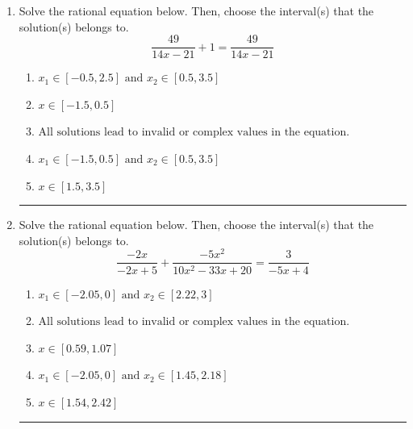 \documentclass[14pt]{extbook}
\newcommand{\litem}[1]{\item#1\hspace*{-1cm}\rule{\textwidth}{0.4pt}}
\begin{document}
\begin{enumerate}
\litem{
Solve the rational equation below. Then, choose the interval(s) that the solution(s) belongs to.\[ \frac{49}{14x -21} + 1 = \frac{49}{14x -21} \]\begin{enumerate}[label=\Alph*.]
\item \( x_1 \in [-0.5, 2.5] \text{ and } x_2 \in [0.5,3.5] \)
\item \( x \in [-1.5,0.5] \)
\item \( \text{All solutions lead to invalid or complex values in the equation.} \)
\item \( x_1 \in [-1.5, 0.5] \text{ and } x_2 \in [0.5,3.5] \)
\item \( x \in [1.5,3.5] \)

\end{enumerate} }
\litem{
Solve the rational equation below. Then, choose the interval(s) that the solution(s) belongs to.\[ \frac{-2x}{-2x + 5} + \frac{-5x^{2}}{10x^{2} -33 x + 20} = \frac{3}{-5x + 4} \]\begin{enumerate}[label=\Alph*.]
\item \( x_1 \in [-2.05, 0] \text{ and } x_2 \in [2.22,3] \)
\item \( \text{All solutions lead to invalid or complex values in the equation.} \)
\item \( x \in [0.59,1.07] \)
\item \( x_1 \in [-2.05, 0] \text{ and } x_2 \in [1.45,2.18] \)
\item \( x \in [1.54,2.42] \)


\end{enumerate}}
\end{enumerate}
\end{document}
